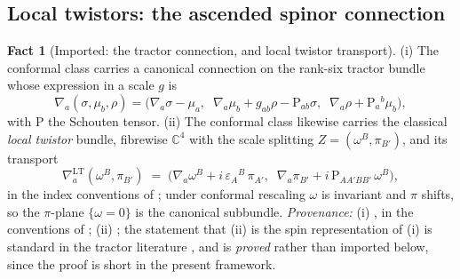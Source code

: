 \documentclass[11pt]{article}
\theoremstyle{definition}
\newtheorem{fact}[theorem]{Fact}
\newcommand{\C}{\mathbb{C}}
\begin{document}
\subsection{Local twistors: the ascended spinor connection}\label{subsec:localtwistor}

\begin{fact}[Imported: the tractor connection, and local twistor transport]\label{fact:ltt}
(i) The conformal class carries a canonical connection on the rank-six tractor bundle whose expression in a scale $g$ is
\[
\nabla_a(\sigma, \mu_b, \rho) = \bigl(\nabla_a\sigma - \mu_a,\;\; \nabla_a\mu_b + g_{ab}\rho - \mathrm{P}_{ab}\sigma,\;\; \nabla_a\rho + \mathrm{P}_a{}^b\mu_b\bigr),
\]
with $\mathrm{P}$ the Schouten tensor. (ii) The conformal class likewise carries the classical \emph{local twistor} bundle, fibrewise $\C^4$ with the scale splitting $Z = (\omega^B, \pi_{B'})$, and its transport
\[
\nabla^{\mathrm{LT}}_a(\omega^B, \pi_{B'}) \;=\; \bigl(\nabla_a \omega^B + i\,\varepsilon_A{}^B\,\pi_{A'},\;\; \nabla_a\pi_{B'} + i\,\mathrm{P}_{AA'BB'}\,\omega^B\bigr),
\]
in the index conventions of \cite[Vol.~2, Ch.~6]{PenroseRindler86}; under conformal rescaling $\omega$ is invariant and $\pi$ shifts, so the $\pi$-plane $\{\omega = 0\}$ is the canonical subbundle. \emph{Provenance:} (i) \cite{BEG1994, CurryGover2018}, in the conventions of \cite[Fact 4.1, eq.~(3)]{ButlerT6}; (ii) \cite{PenroseMacCallum73, Dighton74}; the statement that (ii) is the spin representation of (i) is standard in the tractor literature \cite{BEG1994, CurryGover2018}, and is \emph{proved} rather than imported below, since the proof is short in the present framework.
\end{fact}
\end{document}
